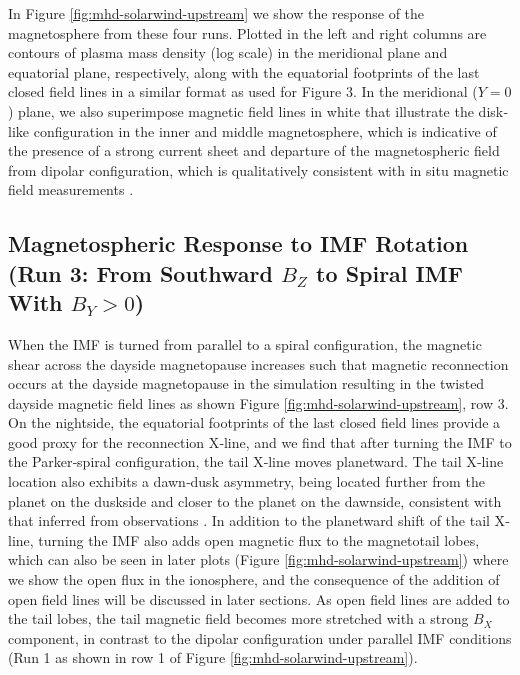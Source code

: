 In Figure \ref{fig:mhd-solarwind-upstream} we show the response of the magnetosphere from these four runs. Plotted in the left and right columns are contours of plasma mass density (log scale) in the meridional plane and equatorial plane, respectively, along with the equatorial footprints of the last closed field lines in a similar format as used for Figure 3. In the meridional ($Y = 0$) plane, we also superimpose magnetic field lines in white that illustrate the disk‐like configuration in the inner and middle magnetosphere, which is indicative of the presence of a strong current sheet and departure of the magnetospheric field from dipolar configuration, which is qualitatively consistent with in situ magnetic field measurements \cite{Khurana2001}. 

\subsection{Magnetospheric Response to IMF Rotation (Run 3: From Southward \texorpdfstring{$B_Z$}{Bz} to Spiral IMF With \texorpdfstring{$B_Y > 0$}{By>0}) }

When the IMF is turned from parallel to a spiral configuration, the magnetic shear across the dayside magnetopause increases such that magnetic reconnection occurs at the dayside magnetopause in the simulation resulting in the twisted dayside magnetic field lines as shown Figure \ref{fig:mhd-solarwind-upstream}, row 3. On the nightside, the equatorial footprints of the last closed field lines provide a good proxy for the reconnection X‐line, and we find that after turning the IMF to the Parker‐spiral configuration, the tail X‐line moves planetward. The tail X‐line location also exhibits a dawn‐dusk asymmetry, being located further from the planet on the duskside and closer to the planet on the dawnside, consistent with that inferred from observations \cite{Vogt2010a,Vogt2014,Woch2002a}. In addition to the planetward shift of the tail X‐line, turning the IMF also adds open magnetic flux to the magnetotail lobes, which can also be seen in later plots (Figure \ref{fig:mhd-solarwind-upstream}) where we show the open flux in the ionosphere, and the consequence of the addition of open field lines will be discussed in later sections. As open field lines are added to the tail lobes, the tail magnetic field becomes more stretched with a strong $B_X$ component, in contrast to the dipolar configuration under parallel IMF conditions (Run 1 as shown in row 1 of Figure \ref{fig:mhd-solarwind-upstream}). 

